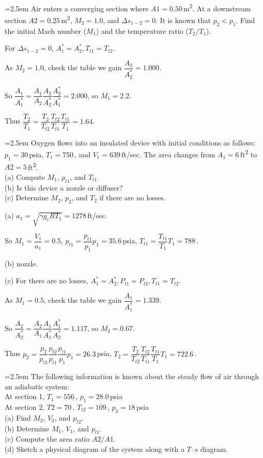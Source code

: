 \documentclass[12pt]{article}
\newlength{\questionlabelwidth}
\newcommand{\question}[2]{%
  \par\noindent
  {\hangindent=2.5em %
   \hangafter=1 %
   \makebox[\questionlabelwidth][l]{\textbf{#1}}#2\par}%
}
\begin{document}
\question{5.2}{Air enters a converging section where $A1 = 0.50$\,\si{m^2}. At a downstream section $A2 = 0.25$\,\si{m^2}, $M_2=1.0$, and $\Delta s_{1-2}=0$. It is known that $p_2 < p_1$. Find the initial Mach number ($M_1$) and the temperature ratio ($T_2/T_1$).
}

\begin{answerbox}
For $\Delta s_{1-2}=0$, $A_1^{*}=A_2^{*}, T_{t1}=T_{t2}$.

As $M_2=1.0$, check the table we gain $\dfrac{A_2}{A_2^{*}}=1.000$.

So $\dfrac{A_1}{A_1^{*}}=\dfrac{A_1}{A_2}\dfrac{A_2}{A_2^{*}}\dfrac{A_2^{*}}{A_1^{*}}=2.000$, so $M_1=2.2$.

Thus $\dfrac{T_2}{T_1}=\dfrac{T_2}{T_{t2}}\dfrac{T_{t2}}{T_{t1}}\dfrac{T_{t1}}{T_1}=1.64$.
\end{answerbox}

\question{5.3}{Oxygen flows into an insulated device with initial conditions as follows: $p_1 = 30$\,\si{psia}, $T_1 = 750$\,\si{\Rankine}, and $V_1 = 639$\,\si{ft/sec}. The area changes from $A_1 = 6$\,\si{ft^2} to $A2 = 5$\,\si{ft^2}.\\
(a)	Compute $M_1$, $p_{t1}$, and $T_{t1}$.\\
(b)	Is this device a nozzle or diffuser?\\
(c)	Determine $M_2$, $p_2$, and $T_2$ if there are no losses.
}

\begin{answerbox}
(a) $a_1=\sqrt{\gamma g_c R T_1}=1278$\,\si{ft/sec}.

So $M_1=\dfrac{V_1}{a_1}=0.5$, $p_{t1}=\dfrac{p_{t1}}{p_1}p_1=35.6$\,\si{psia}, $T_{t1}=\dfrac{T_{t1}}{T_1}T_1=788$\,\si{\Rankine}.

(b) nozzle.

(c) For there are no losses, $A_1^{*}=A_2^{*}, P_{t1}=P_{t2}, T_{t1}=T_{t2}$.

As $M_1=0.5$, check the table we gain $\dfrac{A_1}{A_1^{*}}=1.339$.

So $\dfrac{A_2}{A_2^{*}}=\dfrac{A_2}{A_1}\dfrac{A_1}{A_1^{*}}\dfrac{A_1^{*}}{A_2^{*}}=1.117$, so $M_2=0.67$.

Thus $p_2=\dfrac{p_2}{p_{t2}}\dfrac{p_{t2}}{p_{t1}}\dfrac{p_{t1}}{p_1}p_1=26.3$\,\si{psia}, $T_2=\dfrac{T_2}{T_{t2}}\dfrac{T_{t2}}{T_{t1}}\dfrac{T_{t1}}{T_1}T_1=722.6$\,\si{\Rankine}.
\end{answerbox}

\question{5.5}{The following information is known about the steady flow of air through an adiabatic system:\\
\indent At section 1, $T_1 = 556$\,\si{\Rankine}, $p_1= 28.0$\,\si{psia}\\
\indent At section 2, $T2 = 70$\,\si{\Fahrenheit}, $T_{t2} = 109$\,\si{\Fahrenheit}, $p_2 = 18$\,\si{psia}\\
(a)	Find $M_2$, $V_2$, and $p_{t2}$.\\
(b)	Determine $M_1$, $V_1$, and $p_{t1}$.\\
(c)	Compute the area ratio $A2/A1$.\\
(d)	Sketch a physical diagram of the system along with a $T–s$ diagram.
}
\end{document}
